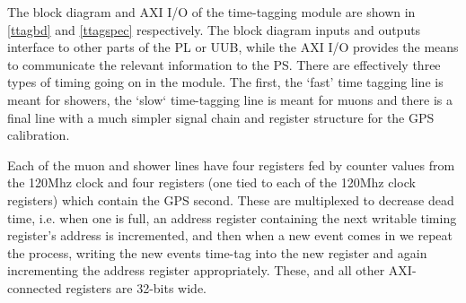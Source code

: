 
The block diagram and AXI I/O of the time-tagging module are shown in \autoref{ttagbd} and \autoref{ttagspec} respectively. The block diagram inputs and outputs interface to other parts of the PL or UUB, while the AXI I/O provides the means to communicate the relevant information to the PS. There are effectively three types of timing going on in the module. The first, the `fast' time tagging line is meant for showers, the `slow` time-tagging line is meant for muons and there is a final line with a much simpler signal chain and register structure for the GPS calibration. 

Each of the muon and shower lines have four registers fed by counter values from the 120Mhz clock and four registers (one tied to each of the 120Mhz clock registers) which contain the GPS second. These are multiplexed to decrease dead time, i.e. when one is full, an address register containing the next writable timing register's address is incremented, and then when a new event comes in we repeat the process, writing the new events time-tag into the new register and again incrementing the address register appropriately. These, and all other AXI-connected registers are 32-bits wide. 

